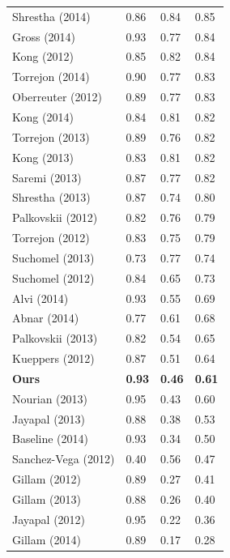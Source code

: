 \begin{table}[th]
\begin{tabularx}{.31\textwidth}{@{}l*{3}{X}}
Shrestha (2014)      &      0.86 &   0.84 &  0.85 \\
Gross (2014)         &      0.93 &   0.77 &  0.84 \\
Kong (2012)          &      0.85 &   0.82 &  0.84 \\
Torrejon (2014)      &      0.90 &   0.77 &  0.83 \\
Oberreuter (2012)    &      0.89 &   0.77 &  0.83 \\
Kong (2014)          &      0.84 &   0.81 &  0.82 \\
Torrejon (2013)      &      0.89 &   0.76 &  0.82 \\
Kong (2013)          &      0.83 &   0.81 &  0.82 \\
Saremi (2013)        &      0.87 &   0.77 &  0.82 \\
Shrestha (2013)      &      0.87 &   0.74 &  0.80 \\
Palkovskii (2012)    &      0.82 &   0.76 &  0.79 \\
Torrejon (2012)      &      0.83 &   0.75 &  0.79 \\
Suchomel (2013)      &      0.73 &   0.77 &  0.74 \\
Suchomel (2012)      &      0.84 &   0.65 &  0.73 \\
Alvi (2014)          &      0.93 &   0.55 &  0.69 \\
Abnar (2014)         &      0.77 &   0.61 &  0.68 \\
Palkovskii (2013)    &      0.82 &   0.54 &  0.65 \\
Kueppers (2012)      &      0.87 &   0.51 &  0.64 \\
\textbf{Ours}        & \textbf{0.93} &   \textbf{0.46} &  \textbf{0.61} \\
Nourian (2013)       &      0.95 &   0.43 &  0.60 \\
Jayapal (2013)       &      0.88 &   0.38 &  0.53 \\
Baseline (2014)      &      0.93 &   0.34 &  0.50 \\
Sanchez-Vega (2012)  &      0.40 &   0.56 &  0.47 \\
Gillam (2012)        &      0.89 &   0.27 &  0.41 \\
Gillam (2013)        &      0.88 &   0.26 &  0.40 \\
Jayapal (2012)       &      0.95 &   0.22 &  0.36 \\
Gillam (2014)        &      0.89 &   0.17 &  0.28 \\
\bottomrule
\end{tabularx}

\end{table}
